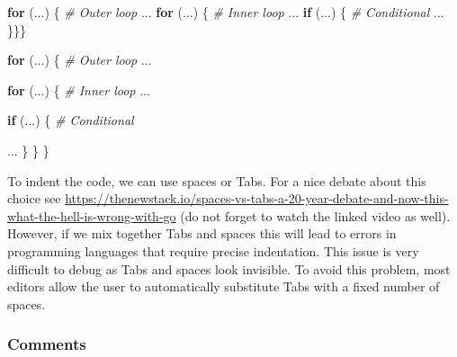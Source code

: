 \documentclass[
  11pt,
]{book}
\newenvironment{Shaded}{\begin{snugshade}}{\end{snugshade}}
\newcommand{\CommentTok}[1]{\textcolor[rgb]{0.56,0.35,0.01}{\textit{#1}}}
\newcommand{\ControlFlowTok}[1]{\textcolor[rgb]{0.13,0.29,0.53}{\textbf{#1}}}
\newcommand{\NormalTok}[1]{#1}
\newenvironment{code-tex-bad}
  {\begingroup\definecolor{shadecolor}{RGB}{255, 189, 185}}
  {\endgroup}
\newenvironment{code-tex-good}
  {\begingroup\definecolor{shadecolor}{RGB}{224, 240, 227}}
  {\endgroup}
\begin{document}
\begin{itemize}
  \begin{code-tex-bad}

\begin{Shaded}
\begin{Highlighting}[]
\ControlFlowTok{for}\NormalTok{ (...) \{   }\CommentTok{\# Outer loop}
\NormalTok{...}
\ControlFlowTok{for}\NormalTok{ (...) \{   }\CommentTok{\# Inner loop}
\NormalTok{...}
\ControlFlowTok{if}\NormalTok{ (...) \{    }\CommentTok{\# Conditional }
\NormalTok{...}
\NormalTok{\}\}\}}
\end{Highlighting}
\end{Shaded}

  \end{code-tex-bad}

  \begin{code-tex-good}

\begin{Shaded}
\begin{Highlighting}[]
\ControlFlowTok{for}\NormalTok{ (...) \{   }\CommentTok{\# Outer loop}
\NormalTok{  ...}

  \ControlFlowTok{for}\NormalTok{ (...) \{   }\CommentTok{\# Inner loop}
\NormalTok{    ...}

    \ControlFlowTok{if}\NormalTok{ (...) \{    }\CommentTok{\# Conditional}

\NormalTok{      ...}
\NormalTok{    \}}
\NormalTok{  \}}
\NormalTok{\}}
\end{Highlighting}
\end{Shaded}

  \end{code-tex-good}

  To indent the code, we can use spaces or Tabs. For a nice debate about this choice see \url{https://thenewstack.io/spaces-vs-tabs-a-20-year-debate-and-now-this-what-the-hell-is-wrong-with-go} (do not forget to watch the linked video as well). However, if we mix together Tabs and spaces this will lead to errors in programming languages that require precise indentation. This issue is very difficult to debug as Tabs and spaces look invisible. To avoid this problem, most editors allow the user to automatically substitute Tabs with a fixed number of spaces.
\end{itemize}

\hypertarget{comments}{%
\subsubsection{Comments}\label{comments}}
\end{document}
